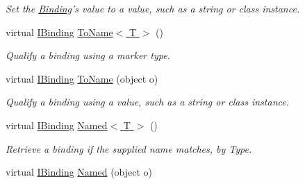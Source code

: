 \begin{DoxyCompactItemize}
\begin{DoxyCompactList}\small\item\em Set the \hyperlink{classstrange_1_1framework_1_1impl_1_1_binding}{Binding}'s value to a value, such as a string or class instance. \end{DoxyCompactList}\item 
\hypertarget{classstrange_1_1framework_1_1impl_1_1_binding_aeaeda4996904515ad88b02d1f018b998}{virtual \hyperlink{interfacestrange_1_1framework_1_1api_1_1_i_binding}{I\-Binding} \hyperlink{classstrange_1_1framework_1_1impl_1_1_binding_aeaeda4996904515ad88b02d1f018b998}{To\-Name$<$ T $>$} ()}\label{classstrange_1_1framework_1_1impl_1_1_binding_aeaeda4996904515ad88b02d1f018b998}

\begin{DoxyCompactList}\small\item\em Qualify a binding using a marker type. \end{DoxyCompactList}\item 
\hypertarget{classstrange_1_1framework_1_1impl_1_1_binding_a7e84681dddc804c7197128eb9e9a87ad}{virtual \hyperlink{interfacestrange_1_1framework_1_1api_1_1_i_binding}{I\-Binding} \hyperlink{classstrange_1_1framework_1_1impl_1_1_binding_a7e84681dddc804c7197128eb9e9a87ad}{To\-Name} (object o)}\label{classstrange_1_1framework_1_1impl_1_1_binding_a7e84681dddc804c7197128eb9e9a87ad}

\begin{DoxyCompactList}\small\item\em Qualify a binding using a value, such as a string or class instance. \end{DoxyCompactList}\item 
\hypertarget{classstrange_1_1framework_1_1impl_1_1_binding_a12232c09dade189b179f6d5794181f7c}{virtual \hyperlink{interfacestrange_1_1framework_1_1api_1_1_i_binding}{I\-Binding} \hyperlink{classstrange_1_1framework_1_1impl_1_1_binding_a12232c09dade189b179f6d5794181f7c}{Named$<$ T $>$} ()}\label{classstrange_1_1framework_1_1impl_1_1_binding_a12232c09dade189b179f6d5794181f7c}

\begin{DoxyCompactList}\small\item\em Retrieve a binding if the supplied name matches, by Type. \end{DoxyCompactList}\item 
\hypertarget{classstrange_1_1framework_1_1impl_1_1_binding_a278173c5411039b32edd1307656f829a}{virtual \hyperlink{interfacestrange_1_1framework_1_1api_1_1_i_binding}{I\-Binding} \hyperlink{classstrange_1_1framework_1_1impl_1_1_binding_a278173c5411039b32edd1307656f829a}{Named} (object o)}\label{classstrange_1_1framework_1_1impl_1_1_binding_a278173c5411039b32edd1307656f829a}


\end{DoxyCompactItemize}
